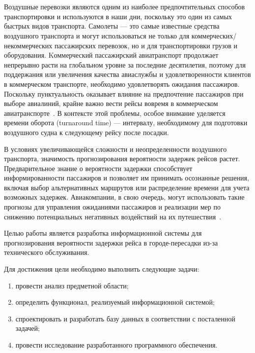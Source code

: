 \newpage
{}
\chapter*{}

Воздушные перевозки являются одним из наиболее предпочтительных способов транспортировки и используются в наши дни, поскольку это один из самых быстрых видов транспорта.
Самолеты --- это самые известные средства воздушного транспорта и могут использоваться не только для коммерческих/некоммерческих пассажирских перевозок, но и для транспортировки грузов и оборудования.
Kоммерческий пассажирский авиатранспорт продолжает непрерывно расти на глобальном уровне за последние десятилетия, поэтому для поддержания или увеличения качества авиаслужбы и удовлетворенности клиентов в коммерческом транспорте, необходимо удовлетворять ожидания пассажиров.
Поскольку пунктуальность оказывает влияние на предпочтение пассажиров при выборе авиалиний, крайне важно вести рейсы вовремя в коммерческом авиатранспорте~\cite{tat}.
В контексте этой проблемы, особое внимание уделяется времени оборота (turnaround time) --- интервалу, необходимому для подготовки воздушного судна к следующему рейсу после посадки.

В условиях увеличивающейся сложности и неопределенности воздушного транспорта, значимость прогнозирования вероятности задержек рейсов растет.
Предварительное знание о вероятности задержки способствует информированности пассажиров и позволяет им принимать осознанные решения, включая выбор альтернативных маршрутов или распределение времени для учета возможных задержек.
Авиакомпании, в свою очередь, могут использовать такие прогнозы для управления ожиданиями пассажиров и реализации мер по снижению потенциальных негативных воздействий на их путешествия~\cite{trt}.

Целью работы является разработка информационной системы для прогнозирования вероятности задержки рейса в городе-пересадки из-за технического обслуживания.

Для достижения цели необходимо выполнить следующие задачи:
\begin{enumerate}[label=\arabic*)]
    \item провести анализ предметной области;
    \item определить функционал, реализуемый информационной системой;
    \item спроектировать и разработать базу данных в соответствии с посталенной задачей;
    \item провести исследование разработанного программного обеспечения.
\end{enumerate}



